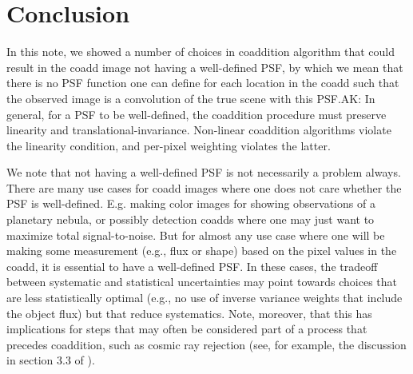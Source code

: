 \documentclass[modern]{style_and_logos/lsstdescnote}
\newcommand{\rachel}[1]{{\color{magenta}RM: #1}}
\newcommand{\mike}[1]{{\color{cyan}MJ: #1}}
\newcommand{\arun}[1]{{\color{blue}AK: #1}}
\begin{document}
\section{Conclusion}

In this note, we showed a number of choices in coaddition algorithm that could result
in the coadd image not having a well-defined PSF, by which we mean that there is no
PSF function one can define for each location in the coadd such that the observed image is a convolution
of the true scene with this PSF.\arun{In general, for a PSF to be well-defined, the coaddition procedure must preserve linearity and translational-invariance. Non-linear coaddition algorithms violate the linearity condition, and per-pixel weighting violates the latter.}

We note that not having a well-defined PSF is not necessarily a problem always.  There are many use cases for coadd images
where one does not care whether the PSF is well-defined.  E.g. making color images
for showing observations of a planetary nebula, or possibly detection coadds where one may just want to maximize total signal-to-noise.
But for almost any use case where one will
be making some measurement (e.g., flux or shape) based on the pixel values in the coadd,
it is essential to have a well-defined PSF.  In these cases, the tradeoff between systematic and statistical uncertainties may point towards choices that are less statistically optimal (e.g., no use of inverse variance weights that include the object flux) but that reduce systematics.  Note, moreover, that this has implications for steps that may often be considered part of a process that precedes coaddition, such as cosmic ray rejection (see, for example, the discussion in section 3.3 of \citealt{2018PASJ...70S...5B}).
\end{document}
